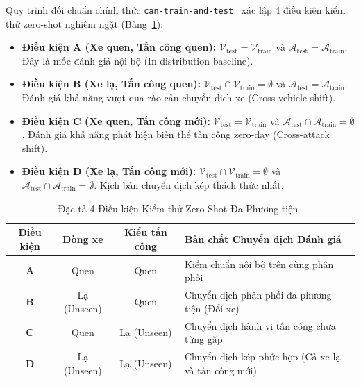 \documentclass[12pt, a4paper, reqno, oneside]{book}
\begin{document}
Quy trình đối chuẩn chính thức \texttt{can-train-and-test}~\cite{lampe2023cantrain,lampe2024curated} xác lập 4 điều kiện kiểm thử zero-shot nghiêm ngặt (Bảng~\ref{tab:eval_conditions}):
\begin{itemize}
    \item \textbf{Điều kiện A (Xe quen, Tấn công quen):} $\mathcal{V}_{\text{test}} = \mathcal{V}_{\text{train}}$ và $\mathcal{A}_{\text{test}} = \mathcal{A}_{\text{train}}$. Đây là mốc đánh giá nội bộ (In-distribution baseline).
    \item \textbf{Điều kiện B (Xe lạ, Tấn công quen):} $\mathcal{V}_{\text{test}} \cap \mathcal{V}_{\text{train}} = \emptyset$ và $\mathcal{A}_{\text{test}} = \mathcal{A}_{\text{train}}$. Đánh giá khả năng vượt qua rào cản chuyển dịch xe (Cross-vehicle shift).
    \item \textbf{Điều kiện C (Xe quen, Tấn công mới):} $\mathcal{V}_{\text{test}} = \mathcal{V}_{\text{train}}$ và $\mathcal{A}_{\text{test}} \cap \mathcal{A}_{\text{train}} = \emptyset$. Đánh giá khả năng phát hiện biến thể tấn công zero-day (Cross-attack shift).
    \item \textbf{Điều kiện D (Xe lạ, Tấn công mới):} $\mathcal{V}_{\text{test}} \cap \mathcal{V}_{\text{train}} = \emptyset$ và $\mathcal{A}_{\text{test}} \cap \mathcal{A}_{\text{train}} = \emptyset$. Kịch bản chuyển dịch kép thách thức nhất.
\end{itemize}

\begin{table}[htbp]
\caption{Đặc tả 4 Điều kiện Kiểm thử Zero-Shot Đa Phương tiện~\cite{lampe2023cantrain,lampe2024curated}}
\label{tab:eval_conditions}
\centering
\renewcommand{\arraystretch}{1.25}
\begin{tabularx}{\textwidth}{c c c X}
\hline
\textbf{Điều kiện} & \textbf{Dòng xe} & \textbf{Kiểu tấn công} & \textbf{Bản chất Chuyển dịch Đánh giá} \\
\hline
\textbf{A} & Quen & Quen & Kiểm chuẩn nội bộ trên cùng phân phối \\
\textbf{B} & Lạ (Unseen) & Quen & Chuyển dịch phân phối đa phương tiện (Đổi xe) \\
\textbf{C} & Quen & Lạ (Unseen) & Chuyển dịch hành vi tấn công chưa từng gặp \\
\textbf{D} & Lạ (Unseen) & Lạ (Unseen) & Chuyển dịch kép phức hợp (Cả xe lạ và tấn công mới) \\
\hline
\end{tabularx}
\end{table}
\end{document}
